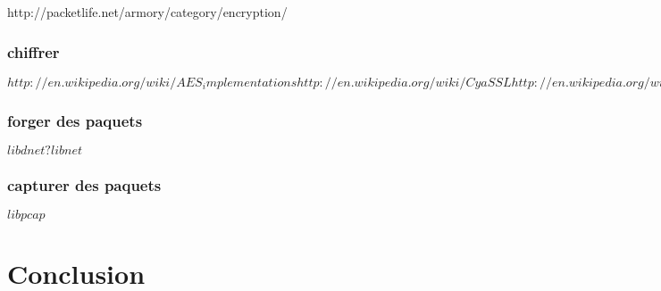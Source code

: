 \documentclass[12pt]{article}
\begin{document}
http://packetlife.net/armory/category/encryption/

\subsubsection{chiffrer}
$http://en.wikipedia.org/wiki/AES_implementations
http://en.wikipedia.org/wiki/CyaSSL
http://en.wikipedia.org/wiki/GnuTLS
http://en.wikipedia.org/wiki/PolarSSL
http://en.wikipedia.org/wiki/OpenSSL$

\subsubsection{forger des paquets}
$libdnet ?
libnet$

\subsubsection{capturer des paquets}
$libpcap$

\clearpage 

\section{Conclusion}
\end{document}
